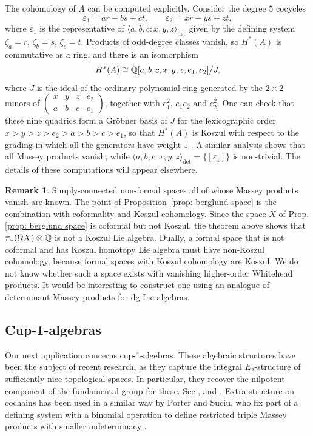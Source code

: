 \documentclass[11pt]{article}
\theoremstyle{definition}
\theoremstyle{definition}
\newtheorem{remark}[theorem]{Remark}
\begin{document}
The cohomology of $A$ can be computed explicitly. Consider the degree $5$ cocycles
\[
\varepsilon_1=ar-bs+ct,\qquad \varepsilon_2=xr-ys+zt,
\]
where $\varepsilon_1$ is the representative of $\langle a,b,c : x,y,z \rangle_{\det}$ given by the
defining system $\zeta_a=r$, $\zeta_b=s$, $\zeta_c=t$.
Products of odd-degree classes vanish, so $H^*(A)$ is commutative as a ring, and
there is an isomorphism
\[
H^*(A)\cong{\mathbb{Q}}[a,b,c,x,y,z,e_1,e_2]/J,
\]
where $J$ is the ideal of the ordinary polynomial ring generated by the $2\times2$ minors of
$\left(\begin{smallmatrix}x&y&z&e_2\\a&b&c&e_1\end{smallmatrix}\right)$, together with
$e_1^2$, $e_1e_2$ and $e_2^2$. One can check that these nine quadrics form a Gr\"obner basis of $J$
for the lexicographic order $x>y>z>e_2>a>b>c>e_1$, so that $H^*(A)$ is Koszul with respect to the
grading in which all the generators have weight $1$ \cite{Fro75,ERT,CDR}.
A similar analysis shows that all Massey products vanish, while
$\langle a,b,c : x,y,z \rangle_{\det}=\{[\varepsilon_1]\}$ is non-trivial. 
The details of these computations will appear elsewhere.


\begin{remark} 
Simply-connected non-formal spaces all of whose Massey products vanish are known.
The point of Proposition~\ref{prop: berglund space} is the combination with coformality and Koszul cohomology.
Since the space $X$ of Prop. \ref{prop: berglund space} 
is coformal but not Koszul, the theorem above shows that $\pi_*(\Omega X)\otimes{\mathbb{Q}}$ is not a Koszul Lie algebra.
Dually, a formal space that is not coformal and has Koszul homotopy Lie algebra must have non-Koszul cohomology,
because formal spaces with Koszul cohomology are Koszul. 
We do not know whether such a space exists with vanishing higher-order Whitehead products.
It would be interesting to construct one using an analogue of determinant Massey products for dg Lie algebras. 
\end{remark}


\subsection{Cup-1-algebras}
\label{sec: Cup-1-algebras}


Our next application concerns cup-1-algebras.
These algebraic structures have been the subject of recent research, 
as they capture the integral $E_2$-structure of sufficiently nice topological spaces.
In particular, they recover the nilpotent component of the fundamental group for these. 
See \cite[Section 1.1]{Porter--Suciu}, and \cite[Section 4.2.1]{Oisin--ObstructionTheory}.
Extra structure on cochains has been used in a similar way by Porter and Suciu,
who fix part of a defining system with a binomial operation 
to define restricted triple Massey products with smaller indeterminacy 
\cite[Def. 9.8 and Lemma 9.9]{PorterSuciu22}.
\end{document}

